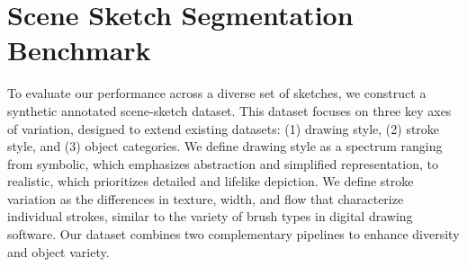 \section{Scene Sketch Segmentation Benchmark}
To evaluate our performance across a diverse set of sketches, we construct a synthetic annotated scene-sketch dataset. This dataset focuses on three key axes of variation, designed to extend existing datasets: (1) drawing style, (2) stroke style, and (3) object categories. 
We define drawing style as a spectrum ranging from symbolic, which emphasizes abstraction and simplified representation, to realistic, which prioritizes detailed and lifelike depiction. We define stroke variation as the differences in texture, width, and flow that characterize individual strokes, similar to the variety of brush types in digital drawing software.
Our dataset combines two complementary pipelines to enhance diversity and object variety. 


